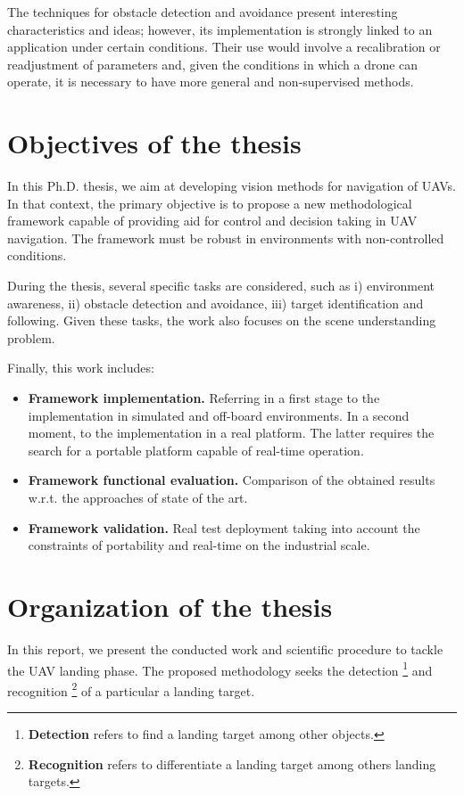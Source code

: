 The techniques for obstacle detection and avoidance present interesting characteristics and ideas; however, its implementation is strongly linked to an application under certain conditions. Their use would involve a recalibration or readjustment of parameters and, given the conditions in which a drone can operate, it is necessary to have more general and non-supervised methods.
 
\section{Objectives of the thesis}\label{sec:thesis_objectives}

In this Ph.D. thesis, we aim at developing vision methods for navigation of UAVs. In that context, the primary objective is to propose a new methodological framework capable of providing aid for control and decision taking in UAV navigation. The framework must be robust in environments with non-controlled conditions. 

During the thesis, several specific tasks are considered, such as i) environment awareness, ii) obstacle detection and avoidance, iii) target identification and following. Given these tasks, the work also focuses on the scene understanding problem. 

Finally, this work includes:  

\begin{itemize}
 \item \textbf{Framework implementation.} Referring in a first stage to the implementation in simulated and off-board environments. In a second moment, to the implementation in a real platform. The latter requires the search for a portable platform capable of real-time operation.
 
 \item \textbf{Framework functional evaluation.} Comparison of the obtained results w.r.t. the approaches of state of the art.
 
 \item \textbf{Framework validation.} Real test deployment taking into account the constraints of portability and real-time on the industrial scale.
 
\end{itemize}

\section{Organization of the thesis}
In this report, we present the conducted work and scientific procedure to tackle the UAV landing phase. The proposed methodology seeks the detection \footnote{\textbf{Detection} refers to find a landing target among other objects.} and recognition \footnote{\textbf{Recognition} refers to differentiate a landing target among others landing targets.} of a particular a landing target. 

